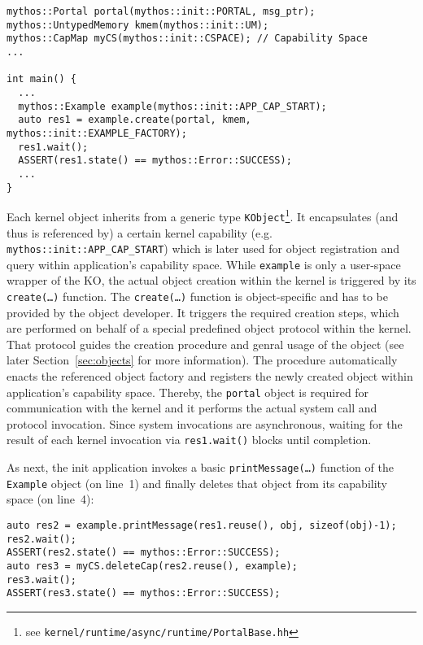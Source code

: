 \begin{lstlisting}
mythos::Portal portal(mythos::init::PORTAL, msg_ptr);
mythos::UntypedMemory kmem(mythos::init::UM);
mythos::CapMap myCS(mythos::init::CSPACE); // Capability Space
...

int main() {
  ...
  mythos::Example example(mythos::init::APP_CAP_START);
  auto res1 = example.create(portal, kmem, mythos::init::EXAMPLE_FACTORY);
  res1.wait();
  ASSERT(res1.state() == mythos::Error::SUCCESS);
  ...   
}
\end{lstlisting}

\noindent Each kernel object inherits from a generic type
\texttt{KObject}\footnote{see
\texttt{kernel/runtime/async/runtime/PortalBase.hh}}.
It encapsulates (and thus is referenced by) a certain kernel capability (e.g.
\texttt{mythos::init::APP\_CAP\_START}) which is later used for object
registration and query within application's capability space. While
\texttt{example} is only a user-space wrapper of the KO, the actual object
creation within the kernel is triggered by its \texttt{create(\ldots)} function.
The \texttt{create(\ldots)} function is object-specific and has to be provided
by the object developer. It triggers the required creation steps, which are
performed on behalf of a special predefined object protocol within the kernel.
That protocol guides the creation procedure and genral usage of the object (see
later Section~\ref{sec:objects} for more information). The procedure
automatically enacts the referenced object factory and registers the newly
created object within application's capability space.
Thereby, the \texttt{portal} object is required for communication with the
kernel and it performs the actual system call and protocol invocation. Since
system invocations are asynchronous, waiting for the result of each kernel
invocation via \texttt{res1.wait()} blocks until completion.

As next, the init application invokes a basic \texttt{printMessage(\ldots)}
function of the \texttt{Example} object (on line~1) and finally deletes that
object from its capability space (on line~4):

\lstset{language=c++}
\begin{lstlisting}
auto res2 = example.printMessage(res1.reuse(), obj, sizeof(obj)-1);
res2.wait();
ASSERT(res2.state() == mythos::Error::SUCCESS);
auto res3 = myCS.deleteCap(res2.reuse(), example);
res3.wait();
ASSERT(res3.state() == mythos::Error::SUCCESS);
\end{lstlisting}


